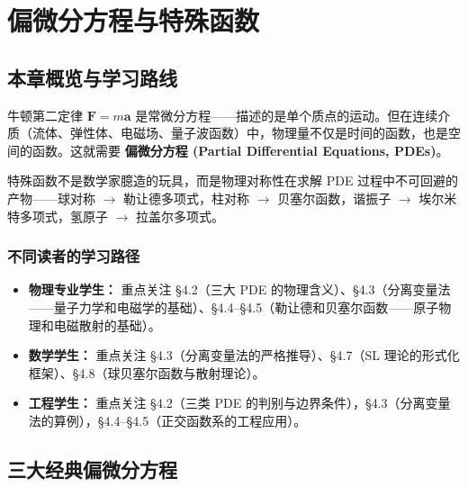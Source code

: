 
\chapter{偏微分方程与特殊函数}

\section{本章概览与学习路线}

牛顿第二定律 $\mathbf{F}=m\mathbf{a}$ 是常微分方程——描述的是单个质点的运动。但在连续介质（流体、弹性体、电磁场、量子波函数）中，物理量不仅是时间的函数，也是空间的函数。这就需要 \textbf{偏微分方程 (Partial Differential Equations, PDEs)}。

特殊函数不是数学家臆造的玩具，而是物理对称性在求解 PDE 过程中不可回避的产物——球对称 $\to$ 勒让德多项式，柱对称 $\to$ 贝塞尔函数，谐振子 $\to$ 埃尔米特多项式，氢原子 $\to$ 拉盖尔多项式。

\begin{center}
\end{center}

\subsection*{不同读者的学习路径}

\begin{itemize}
\item \textbf{物理专业学生：} 重点关注 \S4.2（三大 PDE 的物理含义）、\S4.3（分离变量法——量子力学和电磁学的基础）、\S4.4--\S4.5（勒让德和贝塞尔函数——原子物理和电磁散射的基础）。
\item \textbf{数学学生：} 重点关注 \S4.3（分离变量法的严格推导）、\S4.7（SL 理论的形式化框架）、\S4.8（球贝塞尔函数与散射理论）。
\item \textbf{工程学生：} 重点关注 \S4.2（三类 PDE 的判别与边界条件），\S4.3（分离变量法的算例），\S4.4--\S4.5（正交函数系的工程应用）。
\end{itemize}

\section{三大经典偏微分方程}
\label{sec:pde_types}

